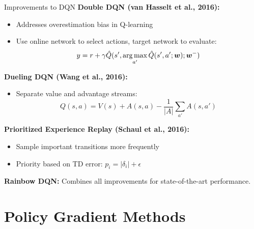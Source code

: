 \documentclass[aspectratio=169]{beamer}
\begin{document}
\begin{frame}{Improvements to DQN}
  \textbf{Double DQN (van Hasselt et al., 2016):}
  \begin{itemize}
    \item Addresses overestimation bias in Q-learning
    \item Use online network to select actions, target network to evaluate:
    $$y = r + \gamma \hat{Q}(s', \operatorname*{arg\,max}_{a'} \hat{Q}(s',a';\boldsymbol{w}); \boldsymbol{w}^-)$$
  \end{itemize}

  \vspace{0.5em}

  \textbf{Dueling DQN (Wang et al., 2016):}
  \begin{itemize}
    \item Separate value and advantage streams:
    $$Q(s,a) = V(s) + A(s,a) - \frac{1}{|A|}\sum_{a'} A(s,a')$$
  \end{itemize}

  \vspace{0.5em}

  \textbf{Prioritized Experience Replay (Schaul et al., 2016):}
  \begin{itemize}
    \item Sample important transitions more frequently
    \item Priority based on TD error: $p_i = |\delta_i| + \epsilon$
  \end{itemize}

  \vspace{0.5em}

  \textbf{Rainbow DQN:} Combines all improvements for state-of-the-art performance.
\end{frame}

\section{Policy Gradient Methods}
\end{document}
